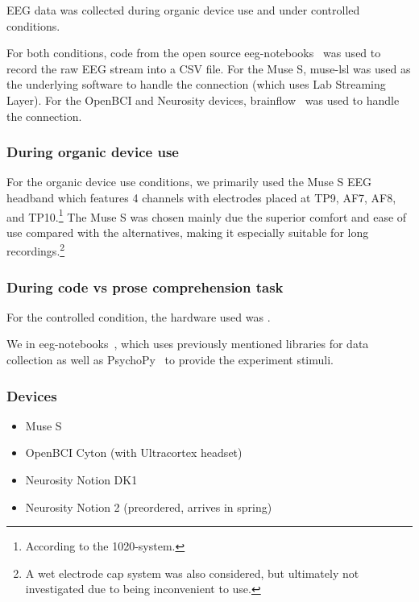 \documentclass[a4paper]{article}
\begin{document}
\begin{refsection}
        EEG data was collected during organic device use and under controlled conditions.

        For both conditions, code from the open source eeg-notebooks~\cite{noauthor_neurotechxeeg-notebooks_2020} was used to record the raw EEG stream into a CSV file. For the Muse S, muse-lsl was used as the underlying software to handle the connection (which uses Lab Streaming Layer). For the OpenBCI and Neurosity devices, brainflow~\cite{noauthor_brainflow-devbrainflow_2020} was used to handle the connection.

        \subsubsection{During organic device use}

            For the organic device use conditions, we primarily used the Muse S EEG headband which features 4 channels with electrodes placed at TP9, AF7, AF8, and TP10.\footnote{According to the 1020-system.} The Muse S was chosen mainly due the superior comfort and ease of use compared with the alternatives, making it especially suitable for long recordings.\footnote{A wet electrode cap system was also considered, but ultimately not investigated due to being inconvenient to use.}

        \subsubsection{During code vs prose comprehension task}

            For the controlled condition, the hardware used was .

            We  in eeg-notebooks~\cite{noauthor_neurotechxeeg-notebooks_2020}, which uses previously mentioned libraries for data collection as well as PsychoPy~\cite{peirce_psychopy2_2019} to provide the experiment stimuli.


        \subsubsection{Devices}

            \begin{itemize}
                \item Muse S
                \item OpenBCI Cyton (with Ultracortex headset)
                \item Neurosity Notion DK1
                \item Neurosity Notion 2 (preordered, arrives in spring)
            \end{itemize}


\end{refsection}
\end{document}
